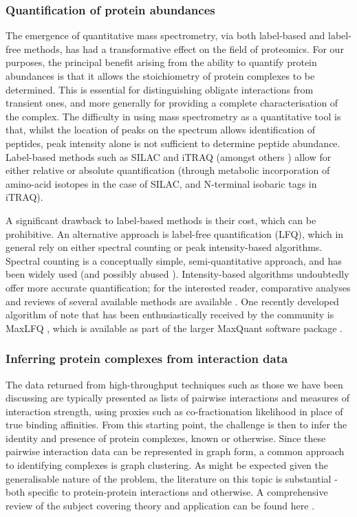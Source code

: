 \documentclass[a4paper,11pt,twoside,openright]{scrbook}
\begin{document}
\subsubsection{Quantification of protein abundances}
The emergence of quantitative mass spectrometry, via both label-based and label-free methods, has had a transformative effect on the field of proteomics. For our purposes, the principal benefit arising from the ability to quantify protein abundances is that it allows the stoichiometry of protein complexes to be determined. This is essential for distinguishing obligate interactions from transient ones, and more generally for providing a complete characterisation of the complex. The difficulty in using mass spectrometry as a quantitative tool is that, whilst the location of peaks on the spectrum allows identification of peptides, peak intensity alone is not sufficient to determine peptide abundance. Label-based methods such as SILAC \cite{Ong2002a} and iTRAQ \cite{Ross2004} (amongst others \cite{Gygi1999,Thompson2003}) allow for either relative or absolute quantification (through metabolic incorporation of amino-acid isotopes in the case of SILAC, and N-terminal isobaric tags in iTRAQ).

A significant drawback to label-based methods is their cost, which can be prohibitive. An alternative approach is label-free quantification (LFQ), which in general rely on either spectral counting \cite{Liu2004,Zybailov2005} or peak intensity-based algorithms. Spectral counting is a conceptually simple, semi-quantitative approach, and has been widely used (and possibly abused \cite{Lundgren2010}). Intensity-based algorithms undoubtedly offer more accurate quantification; for the interested reader, comparative analyses and reviews of several available methods are available \cite{Nahnsen2013,Fabre2014}. One recently developed algorithm of note that has been enthusiastically received by the community is MaxLFQ \cite{Cox2014}, which is available as part of the larger MaxQuant software package \cite{Cox2008}.

\subsubsection{Inferring protein complexes from interaction data}
The data returned from high-throughput techniques such as those we have been discussing are typically presented as lists of pairwise interactions and measures of interaction strength, using proxies such as co-fractionation likelihood in place of true binding affinities. From this starting point, the challenge is then to infer the identity and presence of protein complexes, known or otherwise. Since these pairwise interaction data can be represented in graph form, a common approach to identifying complexes is graph clustering. As might be expected given the generalisable nature of the problem, the literature on this topic is substantial - both specific to protein-protein interactions and otherwise. A comprehensive review of the subject covering theory and application can be found here \cite{Schaeffer2007}.
\end{document}
